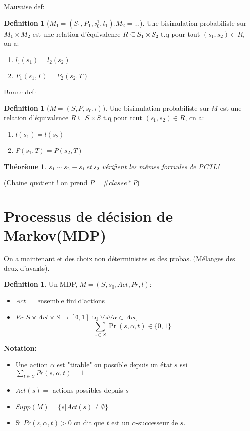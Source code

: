 \documentclass[12pt]{article}
\theoremstyle{plain}
\newtheorem{thm}[subsubsection]{Th\'eor\`eme}
\theoremstyle{definition}
\newtheorem{defn}[subsubsection]{Definition}
\theoremstyle{remark}
\begin{document}
Mauvaise def:
\begin{defn}[$M_1=(S_1, P_1, s_0^1,l_1)$,$M_2=\ldots$]
    Une bisimulation probabiliste sur $M_1\times M_2$ est 
    une relation d'équivalence $R\subseteq S_1\times S_2$
    t.q pour tout $(s_1,s_2)\in R$, on a: 
    \begin{enumerate}
        \item $l_1(s_1)=l_2(s_2)$
        \item $P_1(s_1, T)=P_2(s_2, T)$
    \end{enumerate}
\end{defn}
Bonne def:
\begin{defn}[$M=(S, P, s_0,l)$]
    Une bisimulation probabiliste sur $M$ est 
    une relation d'équivalence $R\subseteq S\times S$
    t.q pour tout $(s_1,s_2)\in R$, on a: 
    \begin{enumerate}
        \item $l(s_1)=l(s_2)$
        \item $P(s_1, T)=P(s_2, T)$
    \end{enumerate}
\end{defn}
\begin{thm}
    $s_1\sim s_2\equiv s_1~et~s_2$ vérifient les mêmes
    formules de PCTL!    
\end{thm}
(Chaine quotient ! on prend $\overline{P}=\#classe*P$)


\newpage
\section{Processus de décision de Markov(MDP)}
On a maintenant et des choix non déterministes et des probas.
(Mélanges des deux d'avants).\\

\begin{defn}
    Un MDP, $M=(S,s_0, Act, Pr, l)$:
    \begin{itemize}
        \item $Act=$ ensemble fini d'actions
        \item $Pr:S\times Act\times S\to [0,1]$ tq 
        $\forall s\forall \alpha\in Act$, 
        \[\sum_{t\in S}\Pr(s,\alpha, t)\in\{0,1\}\]
    \end{itemize}
\end{defn}

\textbf{Notation:}
\begin{itemize}
    \item Une action $\alpha$ est "tirable" ou 
possible depuis un état $s$ ssi $\sum_{t\in S}Pr(s,\alpha,t)=1$
    \item $Act(s)=$ actions possibles depuis $s$
    \item $Supp(M)=\{s|Act(s)\ne\emptyset\}$
    \item Si $Pr(s, \alpha, t)>0$ on dit que 
$t$ est un $\alpha$-successeur de $s$.
\end{itemize}
\end{document}
